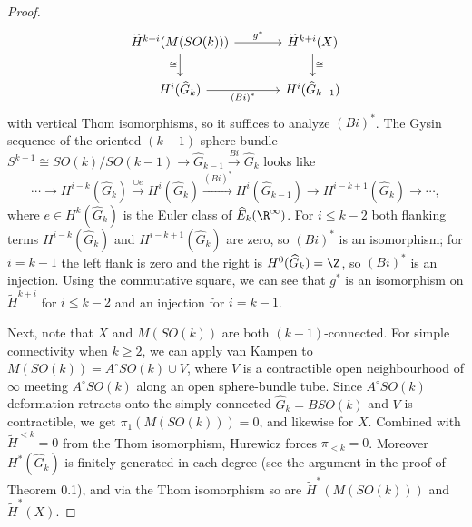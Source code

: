 \begin{proof}
    \[
    \begin{tikzcd}[column sep=large]
        \widetilde H^{k+i}(M(SO(k))) \ar[r,"g^*"] \ar[d,"\cong"'] & \widetilde H^{k+i}(X) \ar[d,"\cong"] \\
        H^i(\widehat G_k) \ar[r,"(Bi)^*"'] & H^i(\widehat G_{k-1})
    \end{tikzcd}
    \]
    with vertical Thom isomorphisms, so it suffices to analyze $(Bi)^*$. The Gysin sequence of the oriented $(k-1)$-sphere bundle $S^{k-1}\cong SO(k)/SO(k-1)\to\widehat G_{k-1}\xrightarrow{Bi}\widehat G_k$ looks like
    \[
        \cdots\to H^{i-k}(\widehat G_k)\xrightarrow{\cup e}H^i(\widehat G_k)\xrightarrow{(Bi)^*}H^i(\widehat G_{k-1})\to H^{i-k+1}(\widehat G_k)\to\cdots,
    \]
    where $e\in H^k(\widehat G_k)$ is the Euler class of $\widehat E_k(\R^\infty)$. For $i\leq k-2$ both flanking terms $H^{i-k}(\widehat G_k)$ and $H^{i-k+1}(\widehat G_k)$ are zero, so $(Bi)^*$ is an isomorphism; for $i=k-1$ the left flank is zero and the right is $H^0(\widehat G_k)=\Z$, so $(Bi)^*$ is an injection. Using the commutative square, we can see that $g^*$ is an isomorphism on $\widetilde H^{k+i}$ for $i\leq k-2$ and an injection for $i=k-1$.

    Next, note that $X$ and $M(SO(k))$ are both $(k-1)$-connected. For simple connectivity when $k\geq 2$, we can apply van Kampen to $M(SO(k))=A^\circ SO(k)\cup V$, where $V$ is a contractible open neighbourhood of $\infty$ meeting $A^\circ SO(k)$ along an open sphere-bundle tube. Since $A^\circ SO(k)$ deformation retracts onto the simply connected $\widehat G_k=BSO(k)$ and $V$ is contractible, we get $\pi_1(M(SO(k)))=0$, and likewise for $X$. Combined with $\widetilde H^{<k}=0$ from the Thom isomorphism, Hurewicz forces $\pi_{<k}=0$. Moreover $H^* (\widehat G_k)$ is finitely generated in each degree (see the argument in the proof of Theorem 0.1), and via the Thom isomorphism so are $\widetilde H^* (M(SO(k)))$ and $\widetilde H^* (X)$.


\end{proof}
